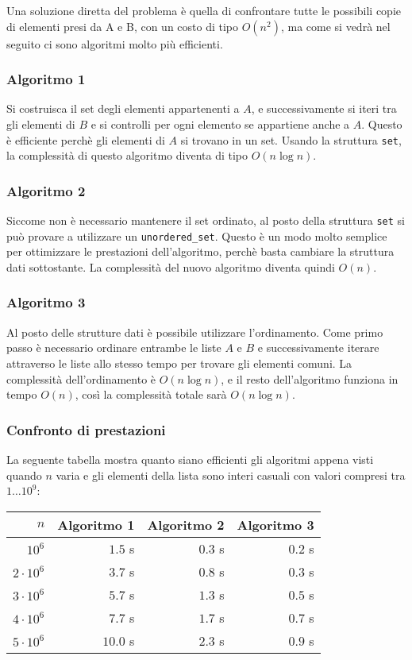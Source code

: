 Una soluzione diretta del problema è quella di
confrontare tutte le possibili copie di elementi 
presi da A e B, con un costo di tipo $O(n^2)$,
ma come si vedrà nel seguito ci sono algoritmi
molto più efficienti.

\subsubsection{Algoritmo 1}

Si costruisca il set degli elementi appartenenti a $A$,
e successivamente si iteri tra gli elementi di $B$ 
e si controlli per ogni elemento se appartiene anche a $A$.
Questo è efficiente perchè gli elementi di $A$
si trovano in un set.
Usando la struttura \texttt{set},
la complessità di questo algoritmo diventa di tipo $O(n \log n)$.

\subsubsection{Algoritmo 2}

Siccome non è necessario mantenere il set ordinato,
al posto della struttura \texttt{set} 
si può provare a utilizzare un \texttt{unordered\_set}.
Questo è un modo molto semplice per ottimizzare 
le prestazioni dell'algoritmo, perchè basta cambiare la
struttura dati sottostante.
La complessità del nuovo algoritmo diventa quindi $O(n)$.

\subsubsection{Algoritmo 3}
Al posto delle strutture dati è possibile utilizzare
l'ordinamento.
Come primo passo è necessario ordinare entrambe le liste $A$ e $B$
e successivamente iterare attraverso le liste allo stesso tempo
per trovare gli elementi comuni.
La complessità dell'ordinamento è $O(n \log n)$,
e il resto dell'algoritmo funziona in tempo $O(n)$,
così la complessità totale sarà $O(n \log n)$.

\subsubsection{Confronto di prestazioni}

La seguente tabella mostra quanto siano efficienti
gli algoritmi appena visti quando $n$ varia e
gli elementi della lista sono interi casuali con valori
compresi tra $1 \ldots 10^9$:

\begin{center}
\begin{tabular}{rrrr}
$n$ & Algoritmo 1 & Algoritmo 2 & Algoritmo 3 \\
\hline
$10^6$ & $1.5$ s & $0.3$ s & $0.2$ s \\
$2 \cdot 10^6$ & $3.7$ s & $0.8$ s & $0.3$ s \\
$3 \cdot 10^6$ & $5.7$ s & $1.3$ s & $0.5$ s \\
$4 \cdot 10^6$ & $7.7$ s & $1.7$ s & $0.7$ s \\
$5 \cdot 10^6$ & $10.0$ s & $2.3$ s & $0.9$ s \\
\end{tabular}
\end{center}

